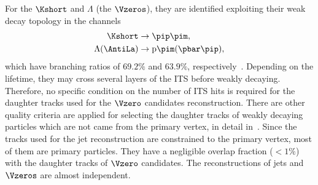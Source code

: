 For the $\Kshort$ and $\Lambda$ (the $\Vzeros$),
they are identified exploiting their weak decay topology in the channels
\begin{equation}
\begin{split}
\Kshort & \to  \pip\pim, \\
\Lambda (\AntiLa) & \to {\rm p}\pim (\pbar\pip),
\end{split}
\end{equation}
which have branching ratios of $69.2\%$ and $63.9\%$,
respectively~\cite{Beringer:1900zz}.
Depending on the lifetime,
they may cross several layers of the ITS before weakly decaying.
Therefore, no specific condition on the number of ITS hits is required for
the daughter tracks used for the $\Vzero$ candidates reconstruction.
There are other quality criteria are applied for selecting the daughter tracks of
weakly decaying particles which are not came from the primary vertex,
in detail in~\cite{Aamodt:2011zza}.
Since the tracks used for the jet reconstruction are constrained to the
primary vertex,  most of them are primary particles.
They have a negligible overlap fraction
($<1\%$)
with the daughter tracks of $\Vzero$ candidates.
The reconstructions of jets and $\Vzeros$ are almost independent.
